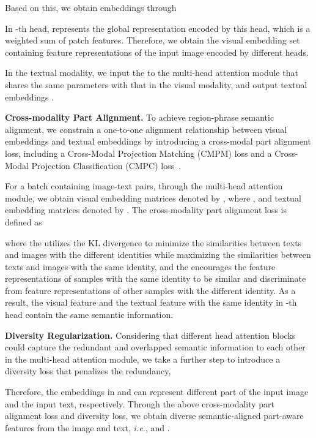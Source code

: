 \documentclass{article}
\begin{document}
Based on this, we obtain  embeddings through

In -th head,  represents the global representation encoded by this head, which is a weighted sum of patch features. Therefore, we obtain the visual embedding set  containing  feature representations of the input image encoded by different heads.\par

In the textual modality, we input the  to the multi-head attention module that shares the same parameters with that in the visual modality, and output  textual embeddings
 .\par
\textbf{Cross-modality Part Alignment.} 
To achieve region-phrase semantic alignment, we constrain a one-to-one alignment relationship between visual embeddings  and textual embeddings  by introducing a cross-modal part alignment loss, including a Cross-Modal Projection Matching (CMPM) loss and a Cross-Modal Projection Classification (CMPC) loss~\cite{zhang2018deep}.\par 

For a batch containing  image-text pairs, through the multi-head attention module, we obtain  visual embedding matrices denoted by , where , and  textual embedding matrices denoted by .
The cross-modality part alignment loss is defined as

where the  utilizes the KL divergence to minimize the similarities between texts and images with the different identities while maximizing the similarities between texts and images with the same identity, and the  encourages the feature representations of samples with the same identity to be similar and discriminate from feature representations of other samples with the different identity. 
As a result, the visual feature  and the textual feature  with the same identity in -th head contain the same semantic information.
\par\textbf{Diversity Regularization.} 
Considering that different head attention blocks could capture the redundant and overlapped semantic information to each other in the multi-head attention module, we take a further step to introduce a diversity loss  that penalizes the redundancy,

\par
Therefore, the embeddings in  and  can represent different part of the input image and the input text, respectively. Through the above cross-modality part alignment loss and diversity loss, we obtain diverse semantic-aligned part-aware features from the image and text, \emph{i.e.},  and .\par
\end{document}
